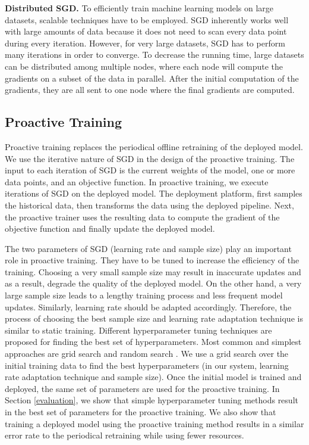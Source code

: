 \textbf{Distributed SGD.}
To efficiently train machine learning models on large datasets, scalable techniques have to be employed.
SGD inherently works well with large amounts of data because it does not need to scan every data point during every iteration.
However, for very large datasets, SGD has to perform many iterations in order to converge.
To decrease the running time, large datasets can be distributed among multiple nodes, where each node will compute the gradients on a subset of the data in parallel.
After the initial computation of the gradients, they are all sent to one node where the final gradients are computed.

\subsection{Proactive Training} \label{proactive-training}
Proactive training replaces the periodical offline retraining of the deployed model.
We use the iterative nature of SGD in the design of the proactive training.
The input to each iteration of SGD is the current weights of the model, one or more data points, and an objective function.
In proactive training, we execute iterations of SGD on the deployed model.
The deployment platform, first samples the historical data, then transforms the data using the deployed pipeline.
Next, the proactive trainer uses the resulting data to compute the gradient of the objective function and finally update the deployed model.

The two parameters of SGD (learning rate and sample size) play an important role in proactive training.
They have to be tuned to increase the efficiency of the training.
Choosing  a very small sample size may result in inaccurate updates and as a result, degrade the quality of the deployed model.
On the other hand, a very large sample size leads to a lengthy training process and less frequent model updates.
Similarly, learning rate should be adapted accordingly.
Therefore, the process of choosing the best sample size and learning rate adaptation technique is similar to static training.
Different hyperparameter tuning techniques are proposed for finding the best set of hyperparameters.
Most common and simplest approaches are grid search and random search \cite{bergstra2012random}.
We use a grid search over the initial training data to find the best hyperparameters (in our system, learning rate adaptation technique and sample size).
Once the initial model is trained and deployed, the same set of parameters are used for the proactive training.
In Section \ref{evaluation}, we show that simple hyperparameter tuning methods result in the best set of parameters for the proactive training.
We also show that training a deployed model using the proactive training method results in a similar error rate to the periodical retraining while using fewer resources.

